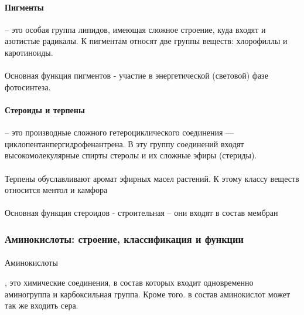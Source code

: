 \paragraph*{Пигменты} -- это особая группа липидов, имеющая сложное строение, куда входят и азотистые радикалы. К пигментам относят две группы веществ: хлорофиллы и каротиноиды.

\paragraph*{}Основная функция пигментов - участие в энергетической (световой) фазе фотосинтеза.

\paragraph*{Стероиды и терпены} -- это производные сложного гетероциклического соединения — циклопентанпергидрофенантрена.  В эту группу соединений входят высокомолекулярные спирты стеролы и их сложные эфиры (стериды).

\paragraph*{}Терпены обуславливают аромат эфирных масел растений. К этому классу веществ относится ментол и камфора

\paragraph*{}Основная функция стероидов - строительная -- они входят в состав мембран

\subsubsection*{Аминокислоты: строение, классификация и функции}


\paragraph*{}\hypertarget{aminoacids}{Аминокислоты}, это химические соединения, в состав которых входит одновременно аминогруппа и карбоксильная группа. Кроме того. в состав аминокислот может так же входить сера.

